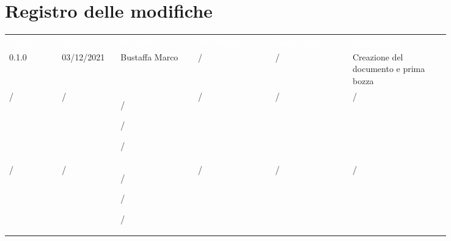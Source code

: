 \section*{Registro delle modifiche}

{\renewcommand{\arraystretch}{1.5}
\scriptsize
\begin{tabular}{p{0.10\linewidth}p{0.10\linewidth}p{0.15\linewidth}p{0.15\linewidth}p{0.15\linewidth}p{0.19\linewidth}}
	\rowcolor[RGB]{33, 73, 50}
	\textcolor{white}{\textbf{Versione}} & \textcolor{white}{\textbf{Data}} & \textcolor{white}
	{\textbf{Redattore}} & \textcolor{white}{\textbf{Verificatore}} & \textcolor{white}{\textbf{Approvatore}} & \textcolor{white}
	{\textbf{Descrizione}}\\
	\rowcolor[RGB]{216, 235, 171}
	0.1.0 & 03/12/2021 & Bustaffa Marco & / &/& Creazione del documento e prima bozza\\
	\rowcolor[RGB]{233, 245, 206}
	/ & / & / \par  /  \par / & / &/& /\\
	\rowcolor[RGB]{216, 235, 171}
	/ & / & / \par  /  \par / &/&/& /\\
\end{tabular}	
}
